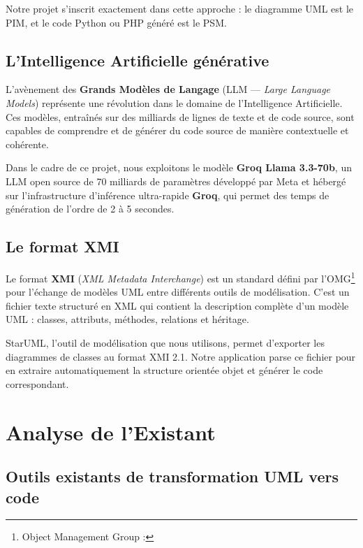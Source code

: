 Notre projet s'inscrit exactement dans cette approche : le diagramme UML est le PIM, et le code Python ou PHP généré est le PSM.

\subsection{L'Intelligence Artificielle générative}

L'avènement des \textbf{Grands Modèles de Langage} (LLM — \textit{Large Language Models}) représente une révolution dans le domaine de l'Intelligence Artificielle. Ces modèles, entraînés sur des milliards de lignes de texte et de code source, sont capables de comprendre et de générer du code source de manière contextuelle et cohérente.

Dans le cadre de ce projet, nous exploitons le modèle \textbf{Groq Llama 3.3-70b}, un LLM open source de 70 milliards de paramètres développé par Meta et hébergé sur l'infrastructure d'inférence ultra-rapide \textbf{Groq}, qui permet des temps de génération de l'ordre de 2 à 5 secondes.

\subsection{Le format XMI}

Le format \textbf{XMI} (\textit{XML Metadata Interchange}) est un standard défini par l'OMG\footnote{Object Management Group : } pour l'échange de modèles UML entre différents outils de modélisation. C'est un fichier texte structuré en XML qui contient la description complète d'un modèle UML : classes, attributs, méthodes, relations et héritage.

StarUML\fnStarUML, l'outil de modélisation que nous utilisons, permet d'exporter les diagrammes de classes au format XMI 2.1. Notre application parse ce fichier pour en extraire automatiquement la structure orientée objet et générer le code correspondant.

\section{Analyse de l'Existant}

\subsection{Outils existants de transformation UML vers code}


